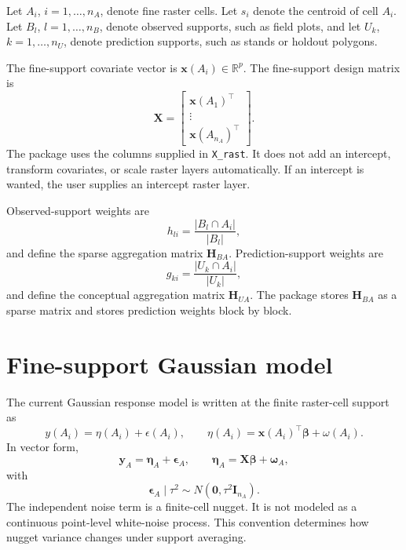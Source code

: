 \documentclass[11pt]{article}
\newcommand{\by}{\bm{y}}
\newcommand{\bbeta}{\bm{\beta}}
\newcommand{\bw}{\bm{\omega}}
\newcommand{\beps}{\bm{\epsilon}}
\newcommand{\bzero}{\bm{0}}
\newcommand{\bI}{\bm{I}}
\newcommand{\bH}{\bm{H}}
\newcommand{\bX}{\bm{X}}
\newcommand{\trans}{^\top}
\begin{document}
Let \(A_i\), \(i=1,\ldots,n_A\), denote fine raster cells. Let \(s_i\) denote
the centroid of cell \(A_i\). Let \(B_l\), \(l=1,\ldots,n_B\), denote observed
supports, such as field plots, and let \(U_k\), \(k=1,\ldots,n_U\), denote
prediction supports, such as stands or holdout polygons.

The fine-support covariate vector is \(\bm{x}(A_i)\in\mathbb{R}^p\). The
fine-support design matrix is
\begin{equation}
  \bX =
  \begin{bmatrix}
    \bm{x}(A_1)\trans\\
    \vdots\\
    \bm{x}(A_{n_A})\trans
  \end{bmatrix}.
\end{equation}
The package uses the columns supplied in \texttt{X\_rast}. It does not add an
intercept, transform covariates, or scale raster layers automatically. If an
intercept is wanted, the user supplies an intercept raster layer.

Observed-support weights are
\begin{equation}
  h_{li} = \frac{|B_l\cap A_i|}{|B_l|},
\end{equation}
and define the sparse aggregation matrix \(\bH_{BA}\). Prediction-support
weights are
\begin{equation}
  g_{ki} = \frac{|U_k\cap A_i|}{|U_k|},
\end{equation}
and define the conceptual aggregation matrix \(\bH_{UA}\). The package stores
\(\bH_{BA}\) as a sparse matrix and stores prediction weights block by block.

\section{Fine-support Gaussian model}

The current Gaussian response model is written at the finite raster-cell
support as
\begin{equation}
  y(A_i) = \eta(A_i) + \epsilon(A_i),
  \qquad
  \eta(A_i) = \bm{x}(A_i)\trans\bbeta + \omega(A_i).
\end{equation}
In vector form,
\begin{equation}
  \by_A = \bm{\eta}_A+\beps_A,
  \qquad
  \bm{\eta}_A = \bX\bbeta+\bw_A,
\end{equation}
with
\begin{equation}
  \beps_A\mid\tau^2\sim N(\bzero,\tau^2\bI_{n_A}).
\end{equation}
The independent noise term is a finite-cell nugget. It is not modeled as a
continuous point-level white-noise process. This convention determines how
nugget variance changes under support averaging.
\end{document}
